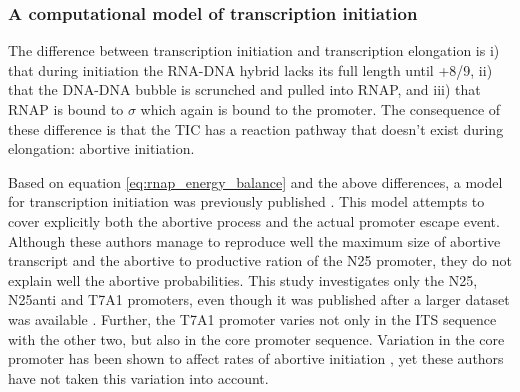 \subsubsection{A computational model of transcription initiation}
The difference between transcription initiation and transcription elongation is
i) that during initiation the RNA-DNA hybrid lacks its full length until +8/9,
ii) that the DNA-DNA bubble is scrunched and pulled into RNAP, and iii) that
RNAP is bound to $\sigma$ which again is bound to the promoter. The consequence
of these difference is that the TIC has a reaction pathway that doesn't exist
during elongation: abortive initiation.

Based on equation \eqref{eq:rnap_energy_balance} and the above differences, a
model for transcription initiation was previously published
\cite{xue_kinetic_2008}. This model attempts to cover explicitly both the
abortive process and the actual promoter escape event. Although these authors
manage to reproduce well the maximum size of abortive transcript and the
abortive to productive ration of the N25 promoter, they do not explain well the
abortive probabilities. This study investigates only the N25, N25anti and T7A1
promoters, even though it was published after a larger dataset was available
\cite{hsu_initial_2006}. Further, the T7A1 promoter varies not only in the ITS
sequence with the other two, but also in the core promoter sequence. Variation
in the core promoter has been shown to affect rates of abortive initiation
\cite{vo_vitro_2003-1}, yet these authors have not taken this variation into
account.
